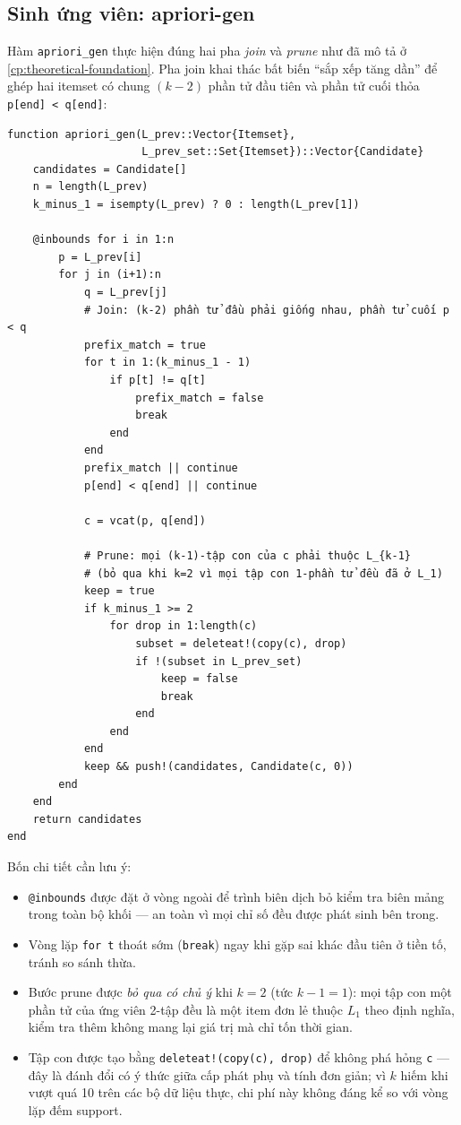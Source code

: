 \subsection{Sinh ứng viên: apriori-gen}

Hàm \texttt{apriori\_gen} thực hiện đúng hai pha \emph{join} và \emph{prune} như đã mô tả ở \autoref{cp:theoretical-foundation}. Pha join khai thác bất biến ``sắp xếp tăng dần'' để ghép hai itemset có chung $(k-2)$ phần tử đầu tiên và phần tử cuối thỏa \texttt{p[end] < q[end]}:

\begin{verbatim}
function apriori_gen(L_prev::Vector{Itemset},
                     L_prev_set::Set{Itemset})::Vector{Candidate}
    candidates = Candidate[]
    n = length(L_prev)
    k_minus_1 = isempty(L_prev) ? 0 : length(L_prev[1])

    @inbounds for i in 1:n
        p = L_prev[i]
        for j in (i+1):n
            q = L_prev[j]
            # Join: (k-2) phần tử đầu phải giống nhau, phần tử cuối p < q
            prefix_match = true
            for t in 1:(k_minus_1 - 1)
                if p[t] != q[t]
                    prefix_match = false
                    break
                end
            end
            prefix_match || continue
            p[end] < q[end] || continue

            c = vcat(p, q[end])

            # Prune: mọi (k-1)-tập con của c phải thuộc L_{k-1}
            # (bỏ qua khi k=2 vì mọi tập con 1-phần tử đều đã ở L_1)
            keep = true
            if k_minus_1 >= 2
                for drop in 1:length(c)
                    subset = deleteat!(copy(c), drop)
                    if !(subset in L_prev_set)
                        keep = false
                        break
                    end
                end
            end
            keep && push!(candidates, Candidate(c, 0))
        end
    end
    return candidates
end
\end{verbatim}

Bốn chi tiết cần lưu ý:
\begin{itemize}
    \item \texttt{@inbounds} được đặt ở vòng ngoài để trình biên dịch bỏ kiểm tra biên mảng trong toàn bộ khối --- an toàn vì mọi chỉ số đều được phát sinh bên trong.
    \item Vòng lặp \texttt{for t} thoát sớm (\texttt{break}) ngay khi gặp sai khác đầu tiên ở tiền tố, tránh so sánh thừa.
    \item Bước prune được \emph{bỏ qua có chủ ý} khi $k=2$ (tức $k\!-\!1=1$): mọi tập con một phần tử của ứng viên 2-tập đều là một item đơn lẻ thuộc $L_1$ theo định nghĩa, kiểm tra thêm không mang lại giá trị mà chỉ tốn thời gian.
    \item Tập con được tạo bằng \texttt{deleteat!(copy(c), drop)} để không phá hỏng \texttt{c} --- đây là đánh đổi có ý thức giữa cấp phát phụ và tính đơn giản; vì $k$ hiếm khi vượt quá 10 trên các bộ dữ liệu thực, chi phí này không đáng kể so với vòng lặp đếm support.
\end{itemize}

